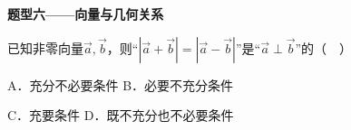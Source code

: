 \documentclass[12pt,a4paper]{article}
\newcommand{\qtitle}[1]{{\Large\bfseries\color[HTML]{1F3864}#1}\par\vspace{0.9em}}
\begin{document}
\qtitle{题型六——向量与几何关系}

已知非零向量$\vec{a},\vec{b}$，则“$|\vec{a}+\vec{b}|=|\vec{a}-\vec{b}|$”是“$\vec{a}\perp\vec{b}$”的（　）\par
\vspace{0.9em}
A．充分不必要条件 \qquad\qquad B．必要不充分条件\par
\vspace{0.45em}
C．充要条件 \qquad\qquad D．既不充分也不必要条件\par
\vspace{0.45em}
\end{document}
